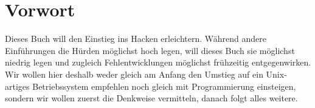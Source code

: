 
\chapter{Vorwort}

Dieses Buch will den Einstieg ins Hacken erleichtern. Während andere Einführungen die Hürden möglichst hoch legen, will dieses Buch sie möglichst niedrig legen und zugleich Fehlentwicklungen möglichst frühzeitig entgegenwirken. Wir wollen hier deshalb weder gleich am Anfang den Umstieg auf ein Unix-artiges Betriebssystem empfehlen noch gleich mit Programmierung einsteigen, sondern wir wollen zuerst die Denkweise vermitteln, danach folgt alles weitere.